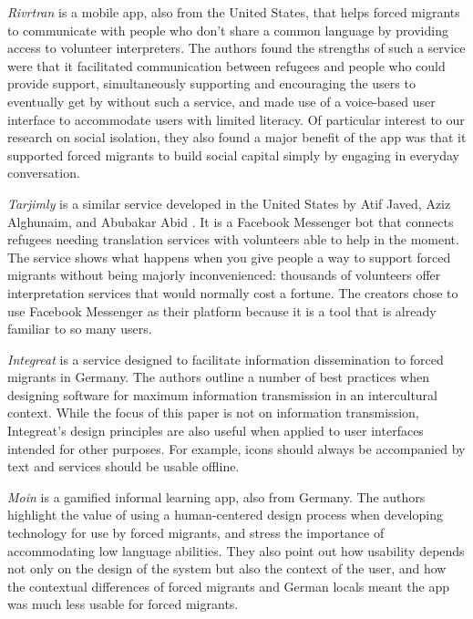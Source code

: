 \textit{Rivrtran} \cite{brown_designing_2016} is a mobile app, also from the United States, that helps forced migrants to communicate with people who don't share a common language by providing access to volunteer interpreters. The authors found the strengths of such a service were that it facilitated communication between refugees and people who could provide support, simultaneously supporting and encouraging the users to eventually get by without such a service, and made use of a voice-based user interface to accommodate users with limited literacy. Of particular interest to our research on social isolation, they also found a major benefit of the app was that it supported forced migrants to build social capital simply by engaging in everyday conversation.

\textit{Tarjimly} is a similar service developed in the United States by Atif Javed, Aziz Alghunaim, and Abubakar Abid \cite{utley_how_2017}. It is a Facebook Messenger bot that connects refugees needing translation services with volunteers able to help in the moment. The service shows what happens when you give people a way to support forced migrants without being majorly inconvenienced: thousands of volunteers offer interpretation services that would normally cost a fortune. The creators chose to use Facebook Messenger as their platform because it is a tool that is already familiar to so many users.

\textit{Integreat} \cite{schreieck_supporting_2017} is a service designed to facilitate information dissemination to forced migrants in Germany. The authors outline a number of best practices when designing software for maximum information transmission in an intercultural context. While the focus of this paper is not on information transmission, Integreat's design principles are also useful when applied to user interfaces intended for other purposes. For example, icons should always be accompanied by text and services should be usable offline.

\textit{Moin} \cite{verbert_refugees_2016} is a gamified informal learning app, also from Germany. The authors highlight the value of using a human-centered design process when developing technology for use by forced migrants, and stress the importance of accommodating low language abilities. They also point out how usability depends not only on the design of the system but also the context of the user, and how the contextual differences of forced migrants and German locals meant the app was much less usable for forced migrants.



